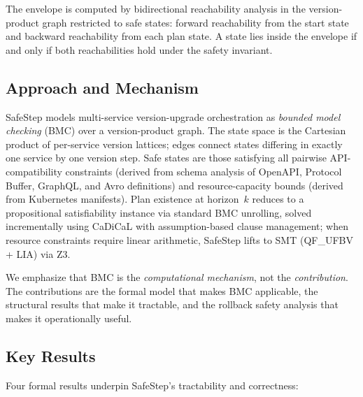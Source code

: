 \documentclass[10pt,twocolumn]{article}
\begin{document}
\noindent
The envelope is computed by bidirectional reachability analysis in the
version-product graph restricted to safe states: forward reachability from
the start state and backward reachability from each plan state.  A state
lies inside the envelope if and only if both reachabilities hold under the
safety invariant.

\subsection{Approach and Mechanism}
\label{sec:intro:approach}

SafeStep models multi-service version-upgrade orchestration as
\emph{bounded model checking} (BMC) over a version-product graph.  The
state space is the Cartesian product of per-service version lattices; edges
connect states differing in exactly one service by one version step.  Safe
states are those satisfying all pairwise API-compatibility constraints
(derived from schema analysis of OpenAPI, Protocol Buffer, GraphQL, and
Avro definitions) and resource-capacity bounds (derived from Kubernetes
manifests).  Plan existence at horizon~$k$ reduces to a propositional
satisfiability instance via standard BMC unrolling, solved incrementally
using CaDiCaL with assumption-based clause management; when resource
constraints require linear arithmetic, SafeStep lifts to SMT (QF\_UFBV +
LIA) via Z3.

We emphasize that BMC is the \emph{computational mechanism}, not the
\emph{contribution}.  The contributions are the formal model that makes
BMC applicable, the structural results that make it tractable, and the
rollback safety analysis that makes it operationally useful.

\subsection{Key Results}
\label{sec:intro:results}

Four formal results underpin SafeStep's tractability and correctness:
\end{document}
